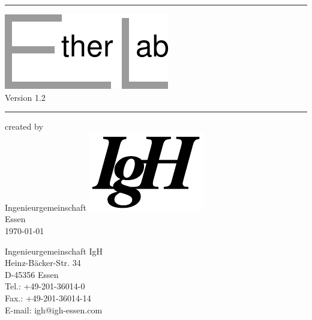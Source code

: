 \documentclass[12pt,a4paper]{scrbook}
\newcommand{\IgH}{\raisebox{-0.7667ex}
  {\includegraphics[height=2.2ex]{images/ighsign}}}
\newcommand{\version}{1.2}
\begin{document}
\begin{titlepage}
  \begin{center}
    \Large
    \sf

    \rule{\textwidth}{1.5mm}

    \Huge
    \raisebox{-0.8ex} {\includegraphics[height=5ex]{images/etherlabsign-gr}}\\[3ex]
    \Large
    Version \version\\[1ex]

    \vspace{1ex}
    \rule{\textwidth}{1.5mm}

    \vspace{18ex}

    \vspace{5ex}
    created by\\[1ex]
    Ingenieurgemeinschaft \IgH\\

    \vspace{\fill}
    Essen\\[2ex]
    \today\\[2ex]
  \end{center}
\end{titlepage}

\begin{titlepage}
  \vspace*{\fill}
  {\small
    Ingenieurgemeinschaft IgH\\
    Heinz-Bäcker-Str. 34\\
    D-45356 Essen\\
    Tel.: +49-201-36014-0\\
    Fax.: +49-201-36014-14\\
    E-mail: igh@igh-essen.com}
\end{titlepage}

\tableofcontents
\listoffigures


\end{document}
